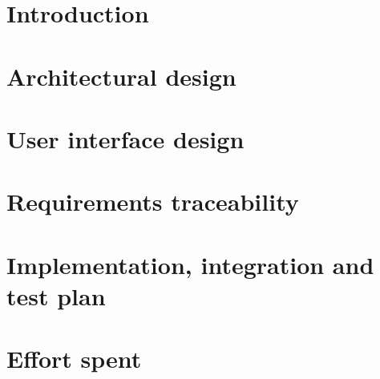 \documentclass{article}
\begin{document}
\newpage

\tableofcontents

\newpage

\section{Introduction}


\newpage

\section{Architectural design}


\newpage

\section{User interface design}



\newpage

\section{Requirements traceability}

\newpage

\section{Implementation, integration and test plan}

\newpage

\section{Effort spent}

\end{document}
